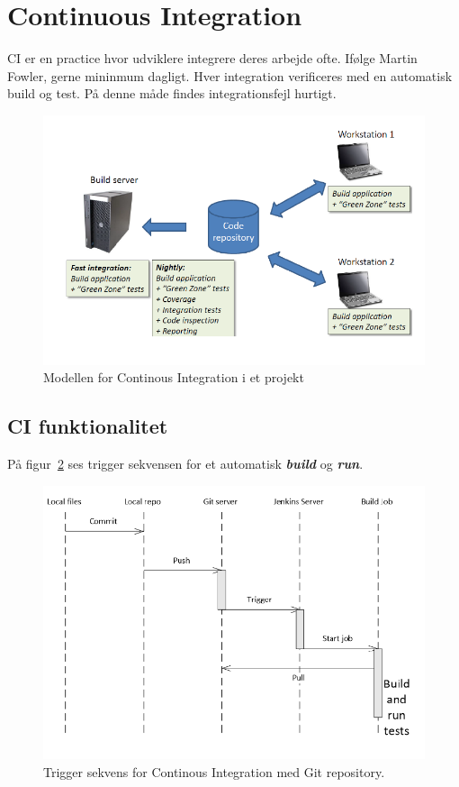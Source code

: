 \section{Continuous Integration}

CI er en practice hvor udviklere integrere deres arbejde ofte. Ifølge Martin Fowler, gerne mininmum dagligt.
Hver integration verificeres med en automatisk build og test. På denne måde findes integrationsfejl hurtigt.

\begin{figure}[H]
\centering
\includegraphics[width=0.7\linewidth]{figs/ciArch.PNG}
\caption{Modellen for Continous Integration i et projekt}
\label{fig:ciArch}
\end{figure}

\subsection{CI funktionalitet}
På figur~\ref{fig:ciTriggerSeq} ses trigger sekvensen for et automatisk \textit{\textbf{build}} og \textit{\textbf{run}}.

\begin{figure}[H]
\centering
\includegraphics[width=0.8\linewidth]{figs/ciTriggerSeq.PNG}
\caption{Trigger sekvens for Continous Integration med Git repository.}
\label{fig:ciTriggerSeq}
\end{figure}

